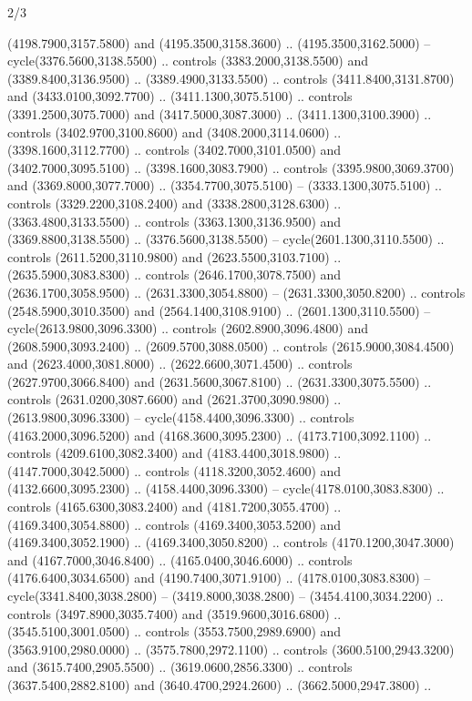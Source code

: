\begin{flagdescription}{2/3}
\begin{scope}[shift={(0.5\flaglength,0.5)},scale=\flagwidth/130]
\begin{scope}[y=0.01mm, x=0.01mm,shift={(-3365,-2250)}]
  (4198.7900,3157.5800) and (4195.3500,3158.3600) .. (4195.3500,3162.5000) --
  cycle(3376.5600,3138.5500) .. controls (3383.2000,3138.5500) and
  (3389.8400,3136.9500) .. (3389.4900,3133.5500) .. controls
  (3411.8400,3131.8700) and (3433.0100,3092.7700) .. (3411.1300,3075.5100) ..
  controls (3391.2500,3075.7000) and (3417.5000,3087.3000) ..
  (3411.1300,3100.3900) .. controls (3402.9700,3100.8600) and
  (3408.2000,3114.0600) .. (3398.1600,3112.7700) .. controls
  (3402.7000,3101.0500) and (3402.7000,3095.5100) .. (3398.1600,3083.7900) ..
  controls (3395.9800,3069.3700) and (3369.8000,3077.7000) ..
  (3354.7700,3075.5100) -- (3333.1300,3075.5100) .. controls
  (3329.2200,3108.2400) and (3338.2800,3128.6300) .. (3363.4800,3133.5500) ..
  controls (3363.1300,3136.9500) and (3369.8800,3138.5500) ..
  (3376.5600,3138.5500) -- cycle(2601.1300,3110.5500) .. controls
  (2611.5200,3110.9800) and (2623.5500,3103.7100) .. (2635.5900,3083.8300) ..
  controls (2646.1700,3078.7500) and (2636.1700,3058.9500) ..
  (2631.3300,3054.8800) -- (2631.3300,3050.8200) .. controls
  (2548.5900,3010.3500) and (2564.1400,3108.9100) .. (2601.1300,3110.5500) --
  cycle(2613.9800,3096.3300) .. controls (2602.8900,3096.4800) and
  (2608.5900,3093.2400) .. (2609.5700,3088.0500) .. controls
  (2615.9000,3084.4500) and (2623.4000,3081.8000) .. (2622.6600,3071.4500) ..
  controls (2627.9700,3066.8400) and (2631.5600,3067.8100) ..
  (2631.3300,3075.5500) .. controls (2631.0200,3087.6600) and
  (2621.3700,3090.9800) .. (2613.9800,3096.3300) -- cycle(4158.4400,3096.3300)
  .. controls (4163.2000,3096.5200) and (4168.3600,3095.2300) ..
  (4173.7100,3092.1100) .. controls (4209.6100,3082.3400) and
  (4183.4400,3018.9800) .. (4147.7000,3042.5000) .. controls
  (4118.3200,3052.4600) and (4132.6600,3095.2300) .. (4158.4400,3096.3300) --
  cycle(4178.0100,3083.8300) .. controls (4165.6300,3083.2400) and
  (4181.7200,3055.4700) .. (4169.3400,3054.8800) .. controls
  (4169.3400,3053.5200) and (4169.3400,3052.1900) .. (4169.3400,3050.8200) ..
  controls (4170.1200,3047.3000) and (4167.7000,3046.8400) ..
  (4165.0400,3046.6000) .. controls (4176.6400,3034.6500) and
  (4190.7400,3071.9100) .. (4178.0100,3083.8300) -- cycle(3341.8400,3038.2800)
  -- (3419.8000,3038.2800) -- (3454.4100,3034.2200) .. controls
  (3497.8900,3035.7400) and (3519.9600,3016.6800) .. (3545.5100,3001.0500) ..
  controls (3553.7500,2989.6900) and (3563.9100,2980.0000) ..
  (3575.7800,2972.1100) .. controls (3600.5100,2943.3200) and
  (3615.7400,2905.5500) .. (3619.0600,2856.3300) .. controls
  (3637.5400,2882.8100) and (3640.4700,2924.2600) .. (3662.5000,2947.3800) ..

\end{scope}
\end{scope}
\end{flagdescription}
